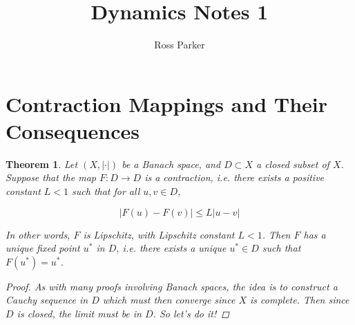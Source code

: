 \documentclass{article}
\title{Dynamics Notes 1}
\author{Ross Parker}
\newtheorem{theorem}{Theorem}[section]
\begin{document}
\section{Contraction Mappings and Their Consequences}


\begin{theorem}Let $(X, |\cdot|)$ be a Banach space, and $D \subset X$ a closed subset of $X$. Suppose that the map $F: D \rightarrow D$ is a contraction, i.e. there exists a positive constant $L < 1$ such that for all $u, v \in D$,

\[
|F(u) - F(v)| \leq L|u - v|
\]

In other words, $F$ is Lipschitz, with Lipschitz constant $L < 1$. Then $F$ has a unique fixed point $u^*$ in $D$, i.e. there exists a unique $u^* \in D$ such that $F(u^*) = u^*$.

\begin{proof}
As with many proofs involving Banach spaces, the idea is to construct a Cauchy sequence in $D$ which must then converge since $X$ is complete. Then since $D$ is closed, the limit must be in $D$. So let's do it!


\end{proof}
\end{theorem}
\end{document}
